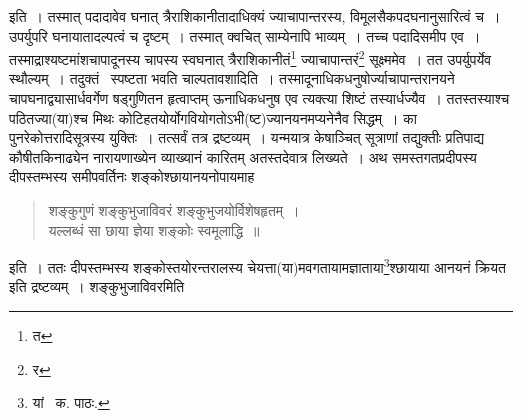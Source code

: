 \documentclass[11pt, openany]{book}
\begin{document}
\noindent इति~। तस्मात् पदादावेव घनात् त्रैराशिकानीतादाधिक्यं ज्याचापान्तरस्य, विमूलसैकपदघनानुसारित्वं च~। उपर्युपरि घनायातादल्पत्वं च दृष्टम्~। तस्मात् क्वचित् साम्येनापि भाव्यम्~। तच्च पदादिसमीप एव~। तस्माद्राश्यष्टमांशचापादूनस्य चापस्य स्वघनात् त्रैराशिकानीतं\renewcommand{\thefootnote}{६}\footnote{त} ज्याचापान्तरं\renewcommand{\thefootnote}{७}\footnote{र} सूक्ष्ममेव~। तत उपर्युपर्येव स्थौल्यम्~। तदुक्तं \textendash\ {\qt स्पष्टता भवति चाल्पतावशादि}ति~। तस्मादूनाधिकधनुषोर्ज्याचापान्तरानयने चापघनाद्व्यासार्धवर्गेण षड्गुणितन हृत्वाप्तम् ऊनाधिकधनुष एव त्यक्त्या शिष्टं तस्यार्धज्यैव~। ततस्तस्याश्च पठितज्या(या)श्च मिथः कोटिहतयोर्योगवियोगतोऽभी(ष्ट)ज्यानयनमप्यनेनैव सिद्धम्~। का पुनरेकोत्तरादिसूत्रस्य युक्तिः~। तत्सर्वं तत्र द्रष्टव्यम्~। यन्मयात्र केषाञ्चित् सूत्राणां तद्युक्तीः प्रतिपाद्य कौषीतकिनाढ्येन नारायणाख्येन व्याख्यानं कारितम् अतस्तदेवात्र लिख्यते~। अथ समस्तगतप्रदीपस्य दीपस्तम्भस्य समीपवर्तिनः शङ्कोश्छायानयनोपायमाह\textendash 

\begin{quote}
{\qt शङ्कुगुणं शङ्कुभुजाविवरं शङ्कुभुजयोर्विशेषहृतम्~।\\
यल्लब्धं सा छाया ज्ञेया शङ्कोः स्वमूलाद्धि~॥}
\end{quote}

\noindent इति~। ततः दीपस्तम्भस्य शङ्कोस्तयोरन्तरालस्य चेयत्ता(या)मवगतायामज्ञाताया\renewcommand{\thefootnote}{८}\footnote{यां \textendash\ क. पाठः.}श्छायाया आनयनं क्रियत इति द्रष्टव्यम्~। शङ्कुभुजाविवरमिति

\newpage
\end{document}
